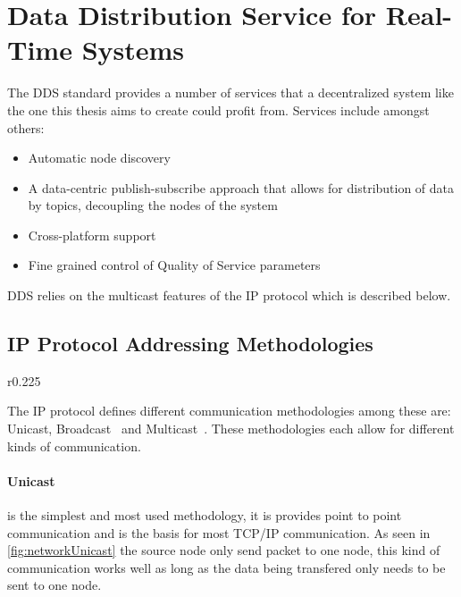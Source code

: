 \section{Data Distribution Service for Real-Time Systems}
The DDS standard provides a number of services that a decentralized system like the one this thesis aims to create could profit from.
Services include amongst others:

\begin{itemize}
	\item Automatic node discovery
	\item A data-centric publish-subscribe approach that allows for distribution of data by topics, decoupling the nodes of the system
	\item Cross-platform support
	\item Fine grained control of Quality of Service parameters
\end{itemize}

DDS relies on the multicast features of the IP protocol which is described below.

\subsection{IP Protocol Addressing Methodologies}

\begin{wrapfigure}{r}{0.225\textwidth}
	\vspace{-20pt}
	
	\vspace{-10pt}
\end{wrapfigure}

The IP protocol defines different communication methodologies among these are: Unicast, Broadcast~\cite{RFC0919_Broadcast} and Multicast~\cite{RFC1112_Multicast_IGMPv1}.
These methodologies each allow for different kinds of communication.

\paragraph{Unicast} is the simplest and most used methodology, it is provides point to point communication and is the basis for most TCP/IP communication.
As seen in \cref{fig:networkUnicast} the source node only send packet to one node, this kind of communication works well as long as the data being transfered only needs to be sent to one node.

